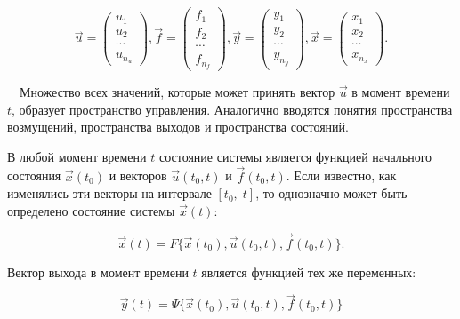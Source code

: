 \begin{equation*}
		\vec u=\left(\begin{matrix}u_1\\u_2\\\cdots \\u_{n_u}\end{matrix}\right),  
		\vec f=\left(\begin{matrix}f_1\\f_2\\\cdots\\f_{n_f}\end{matrix}\right),   
		\vec y=\left(\begin{matrix}y_1\\y_2\\\cdots\\y_{n_y}\end{matrix}\right),  
		\vec x=\left(\begin{matrix}x_1\\x_2\\\cdots\\x_{n_x}\end{matrix}\right).
\end{equation*}



\bigskip


		\ \ Множество всех значений, которые может принять вектор  $\vec u$ в момент времени  $t$, образует пространство
		управления. Аналогично вводятся понятия пространства возмущений, пространства выходов и пространства состояний.



		В любой момент времени  $t$ состояние системы является функцией начального состояния  $\vec x(t_0)$ и векторов  $\vec
		u(t_0,t)$ и  $\vec f(t_0,t)$. Если известно, как изменялись эти векторы на интервале  $[t_0,\;t]$, то однозначно может
		быть определено состояние системы  $\vec x(t)$:



\begin{equation}\label{eq:equation_of_state}
		 \vec x(t)=F\{\vec x(t_0),\vec u(t_0,t),\vec f(t_0,t)\}.%
\end{equation}



		Вектор выхода в момент времени  $t$ является функцией тех же переменных:



\begin{equation}\label{eq:output equation}
		\vec y(t)=\Psi\{\vec x(t_0),\vec u(t_0,t),\vec f(t_0,t)\} %
\end{equation}



